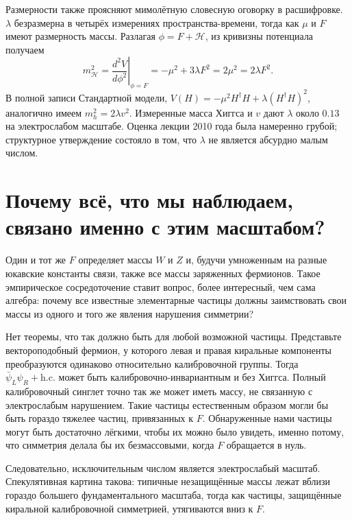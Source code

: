 Размерности также проясняют мимолётную словесную оговорку в расшифровке. \(\lambda\) безразмерна в четырёх измерениях пространства-времени, тогда как \(\mu\) и \(F\) имеют размерность массы. Разлагая \(\phi=F+\mathcal H\), из кривизны потенциала получаем
\begin{equation}
  m_{\mathcal H}^2
  =
  \left.\frac{d^2V}{d\phi^2}\right|_{\phi=F}
  =
  -\mu^2+3\lambda F^2
  =
  2\mu^2
  =
  2\lambda F^2.
  \label{eq:l10-higgs-curvature}
\end{equation}
В полной записи Стандартной модели,
\(V(H)=-\mu^2H^\dagger H+\lambda(H^\dagger H)^2\), аналогично имеем
\(m_h^2=2\lambda v^2\). Измеренные масса Хиггса и \(v\) дают
\(\lambda\) около \(0.13\) на электрослабом масштабе. Оценка лекции 2010 года была намеренно грубой; структурное утверждение состояло в том, что \(\lambda\) не является абсурдно малым числом.

\section{Почему всё, что мы наблюдаем, связано именно с этим масштабом?}

Один и тот же \(F\) определяет массы \(W\) и \(Z\) и, будучи умноженным на разные юкавские константы связи, также все массы заряженных фермионов. Такое эмпирическое сосредоточение ставит вопрос, более интересный, чем сама алгебра: почему все известные элементарные частицы должны заимствовать свои массы из одного и того же явления нарушения симметрии?

Нет теоремы, что так должно быть для любой возможной частицы. Представьте вектороподобный фермион, у которого левая и правая киральные компоненты преобразуются одинаково относительно калибровочной группы. Тогда
\(\bar\psi_L\psi_R+\mathrm{h.c.}\) может быть калибровочно-инвариантным и без Хиггса. Полный калибровочный синглет точно так же может иметь массу, не связанную с электрослабым нарушением. Такие частицы естественным образом могли бы быть гораздо тяжелее частиц, привязанных к \(F\). Обнаруженные нами частицы могут быть достаточно лёгкими, чтобы их можно было увидеть, именно потому, что симметрия делала бы их безмассовыми, когда \(F\) обращается в нуль.

Следовательно, исключительным числом является электрослабый масштаб. Спекулятивная картина такова: типичные незащищённые массы лежат вблизи гораздо большего фундаментального масштаба, тогда как частицы, защищённые киральной калибровочной симметрией, утягиваются вниз к \(F\).

